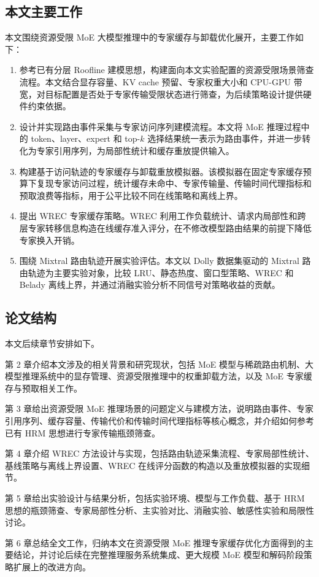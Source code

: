 \subsection{本文主要工作}

本文围绕资源受限 MoE 大模型推理中的专家缓存与卸载优化展开，主要工作如下：

\begin{enumerate}
    \item 参考已有分层 Roofline 建模思想，构建面向本文实验配置的资源受限场景筛查流程。本文结合显存容量、KV cache 预留、专家权重大小和 CPU-GPU 带宽，对目标配置是否处于专家传输受限状态进行筛查，为后续策略设计提供硬件约束依据。
    \item 设计并实现路由事件采集与专家访问序列建模流程。本文将 MoE 推理过程中的 token、layer、expert 和 top-$k$ 选择结果统一表示为路由事件，并进一步转化为专家引用序列，为局部性统计和缓存重放提供输入。
    \item 构建基于访问轨迹的专家缓存与卸载重放模拟器。该模拟器在固定专家缓存预算下复现专家访问过程，统计缓存未命中、专家传输量、传输时间代理指标和预取浪费等指标，用于公平比较不同在线策略和离线上界。
    \item 提出 WREC 专家缓存策略。WREC 利用工作负载统计、请求内局部性和跨层专家转移信息构造在线缓存准入评分，在不修改模型路由结果的前提下降低专家换入开销。
    \item 围绕 Mixtral 路由轨迹开展实验评估。本文以 Dolly 数据集驱动的 Mixtral 路由轨迹为主要实验对象，比较 LRU、静态热度、窗口型策略、WREC 和 Belady 离线上界，并通过消融实验分析不同信号对策略收益的贡献。
\end{enumerate}

\subsection{论文结构}

本文后续章节安排如下。

第 2 章介绍本文涉及的相关背景和研究现状，包括 MoE 模型与稀疏路由机制、大模型推理系统中的显存管理、资源受限推理中的权重卸载方法，以及 MoE 专家缓存与预取相关工作。

第 3 章给出资源受限 MoE 推理场景的问题定义与建模方法，说明路由事件、专家引用序列、缓存容量、传输代价和传输时间代理指标等核心概念，并介绍如何参考已有 HRM 思想进行专家传输瓶颈筛查。

第 4 章介绍 WREC 方法设计与实现，包括路由轨迹采集流程、专家局部性统计、基线策略与离线上界设置、WREC 在线评分函数的构造以及重放模拟器的实现细节。

第 5 章给出实验设计与结果分析，包括实验环境、模型与工作负载、基于 HRM 思想的瓶颈筛查、专家局部性分析、主实验对比、消融实验、敏感性实验和局限性讨论。

第 6 章总结全文工作，归纳本文在资源受限 MoE 推理专家缓存优化方面得到的主要结论，并讨论后续在完整推理服务系统集成、更大规模 MoE 模型和解码阶段策略扩展上的改进方向。
